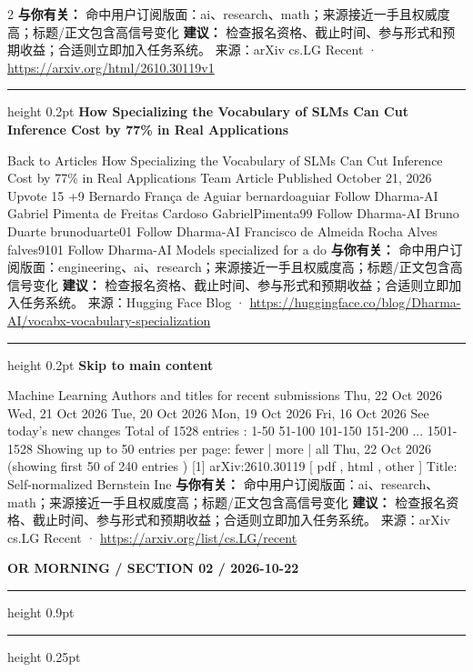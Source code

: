 \documentclass[10.5pt]{ctexart}
\begin{document}
\begin{multicols}{2}
\textbf{与你有关：} 命中用户订阅版面：ai、research、math；来源接近一手且权威度高；标题/正文包含高信号变化
\textbf{建议：} 检查报名资格、截止时间、参与形式和预期收益；合适则立即加入任务系统。
{\footnotesize\color{ormuted} 来源：arXiv cs.LG Recent · \url{https://arxiv.org/html/2610.30119v1}}
\vspace{2mm}
\hrule height 0.2pt
\vspace{2mm}
{\large\bfseries How Specializing the Vocabulary of SLMs Can Cut Inference Cost by 77\% in Real Applications}\par
Back to Articles How Specializing the Vocabulary of SLMs Can Cut Inference Cost by 77\% in Real Applications Team Article Published October 21, 2026 Upvote 15 +9 Bernardo França de Aguiar bernardoaguiar Follow Dharma-AI Gabriel Pimenta de Freitas Cardoso GabrielPimenta99 Follow Dharma-AI Bruno Duarte brunoduarte01 Follow Dharma-AI Francisco de Almeida Rocha Alves falves9101 Follow Dharma-AI Models specialized for a do
\textbf{与你有关：} 命中用户订阅版面：engineering、ai、research；来源接近一手且权威度高；标题/正文包含高信号变化
\textbf{建议：} 检查报名资格、截止时间、参与形式和预期收益；合适则立即加入任务系统。
{\footnotesize\color{ormuted} 来源：Hugging Face Blog · \url{https://huggingface.co/blog/Dharma-AI/vocabx-vocabulary-specialization}}
\vspace{2mm}
\hrule height 0.2pt
\vspace{2mm}
{\large\bfseries Skip to main content}\par
Machine Learning Authors and titles for recent submissions Thu, 22 Oct 2026 Wed, 21 Oct 2026 Tue, 20 Oct 2026 Mon, 19 Oct 2026 Fri, 16 Oct 2026 See today's new changes Total of 1528 entries : 1-50 51-100 101-150 151-200 ... 1501-1528 Showing up to 50 entries per page: fewer | more | all Thu, 22 Oct 2026 (showing first 50 of 240 entries ) [1] arXiv:2610.30119 [ pdf , html , other ] Title: Self-normalized Bernstein Ine
\textbf{与你有关：} 命中用户订阅版面：ai、research、math；来源接近一手且权威度高；标题/正文包含高信号变化
\textbf{建议：} 检查报名资格、截止时间、参与形式和预期收益；合适则立即加入任务系统。
{\footnotesize\color{ormuted} 来源：arXiv cs.LG Recent · \url{https://arxiv.org/list/cs.LG/recent}}
\end{multicols}
\newpage
{\small\bfseries OR MORNING / SECTION 02 / 2026-10-22}
\vspace{2mm}
\hrule height 0.9pt
\vspace{1.5mm}
\hrule height 0.25pt
\vspace{4mm}
\end{document}
